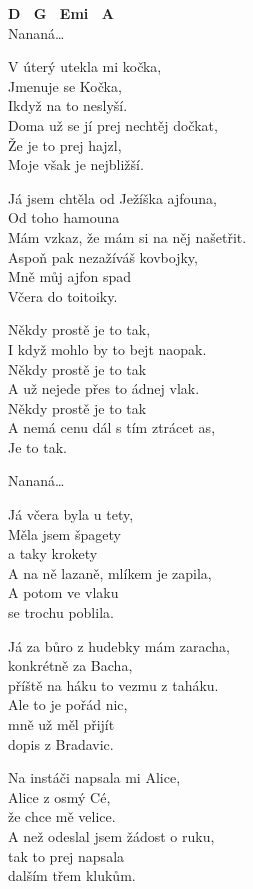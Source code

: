 
\re{}
\textbf{{\footnotesize D \ G \ Emi \ A}}\\
Nananá…

\ve{}
V úterý utekla mi kočka,\\
Jmenuje se Kočka,\\
Ikdyž na to neslyší.\\
Doma už se jí prej nechtěj dočkat,\\
Že je to prej hajzl,\\
Moje však je nejbližší.

\ve{}
Já jsem chtěla od Ježíška ajfouna,\\
Od toho hamouna\\
Mám vzkaz, že mám si na něj našetřit.\\
Aspoň pak nezažíváš kovbojky,\\
Mně můj ajfon spad\\
Včera do toitoiky.
 
\cho{}
Někdy prostě je to tak,\\
I když mohlo by to bejt naopak.\\
Někdy prostě je to tak\\
A už nejede přes to ádnej vlak.\\
Někdy prostě je to tak\\
A nemá cenu dál s tím ztrácet as, \\
Je to tak.

Nananá…
 
\ve{}
Já včera byla u tety,\\
Měla jsem špagety\\
a taky krokety\\
A na ně lazaně, mlíkem je zapila,\\
A potom ve vlaku\\
se trochu poblila.

\ve{}
Já za bůro z hudebky mám zaracha,\\
konkrétně za Bacha,\\
příště na háku to vezmu z taháku.\\
Ale to je pořád nic,\\
mně už měl přijít\\
dopis z Bradavic.
 
\cho{}
 
\ve{}
Na instáči napsala mi Alice,\\
Alice z osmý Cé,\\
že chce mě velice.\\
A než odeslal jsem žádost o ruku,\\
tak to prej napsala\\
dalším třem klukům.

